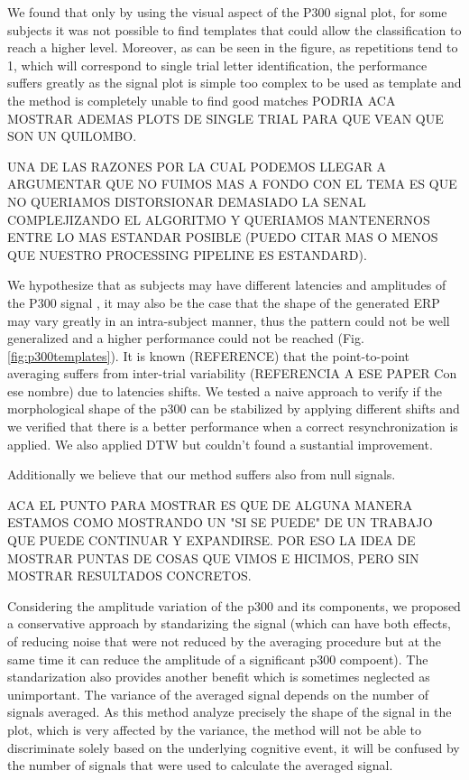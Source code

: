 \documentclass[entropy,article,submit,moreauthors,pdftex,10pt,a4paper]{mdpi}
\begin{document}
We found that only by using the visual aspect of the P300 signal plot,  for some subjects it was not possible to find templates that could allow the classification to reach a higher level.  Moreover, as can be seen in the figure, as repetitions tend to 1, which will correspond to single trial letter identification, the performance suffers greatly as the signal plot is simple too complex to be used as template and the method is completely unable to find good matches  PODRIA ACA MOSTRAR ADEMAS PLOTS DE SINGLE TRIAL PARA QUE VEAN QUE SON UN QUILOMBO.

UNA DE LAS RAZONES POR LA CUAL PODEMOS LLEGAR A ARGUMENTAR QUE NO FUIMOS MAS A FONDO CON EL TEMA ES QUE NO QUERIAMOS DISTORSIONAR DEMASIADO LA SENAL COMPLEJIZANDO EL ALGORITMO Y QUERIAMOS MANTENERNOS ENTRE LO MAS ESTANDAR POSIBLE (PUEDO CITAR MAS O MENOS QUE NUESTRO PROCESSING PIPELINE ES ESTANDARD).

We hypothesize that as subjects may have different latencies and amplitudes of the P300 signal \citep{Riccio2013}, it may also be the case that the shape of the generated ERP may vary greatly in an intra-subject manner, thus the pattern could not be well generalized and a higher performance could not be reached (Fig.  \ref{fig:p300templates}).  It is known (REFERENCE) that the point-to-point averaging suffers from inter-trial variability (REFERENCIA A ESE PAPER Con ese nombre) due to latencies shifts.  We tested a naive approach to verify if the morphological shape of the p300 can be stabilized by applying different shifts and we verified that there is a better performance when a correct resynchronization is applied.  We also applied DTW but couldn't found a sustantial improvement.

Additionally we believe that our method suffers also from null signals.

ACA EL PUNTO PARA MOSTRAR ES QUE DE ALGUNA MANERA ESTAMOS COMO MOSTRANDO UN "SI SE PUEDE" DE UN TRABAJO QUE PUEDE CONTINUAR Y EXPANDIRSE.   POR ESO LA IDEA DE MOSTRAR PUNTAS DE COSAS QUE VIMOS E HICIMOS, PERO SIN MOSTRAR RESULTADOS CONCRETOS.

Considering the amplitude variation of the p300 and its components, we proposed a conservative approach by standarizing the signal (which can have both effects, of reducing noise that were not reduced by the averaging procedure but at the same time it can reduce the amplitude of a significant p300 compoent).   The standarization also provides another benefit which is sometimes neglected as unimportant.  The variance of the averaged signal depends on the number of signals averaged.  As this method analyze precisely the shape of the signal in the plot, which is very affected by the variance, the method will not be able to discriminate solely based on the underlying cognitive event, it will be confused by the number of signals that were used to calculate the averaged signal.
\end{document}
